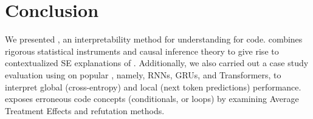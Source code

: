 
\section{Conclusion}
\label{ch:conclusion}

We presented \codegen, an interpretability method for understanding \nlms for code. \codegen combines rigorous statistical instruments and causal inference theory to give rise to contextualized SE explanations of \nlms. Additionally, we also carried out a case study evaluation using \codegen on popular \nlms, namely, RNNs, GRUs, and Transformers, to interpret global (\ie cross-entropy) and local (\ie next token predictions) performance. \codegen exposes erroneous code concepts (\eg conditionals, or loops) by examining Average Treatment Effects and refutation methods.

